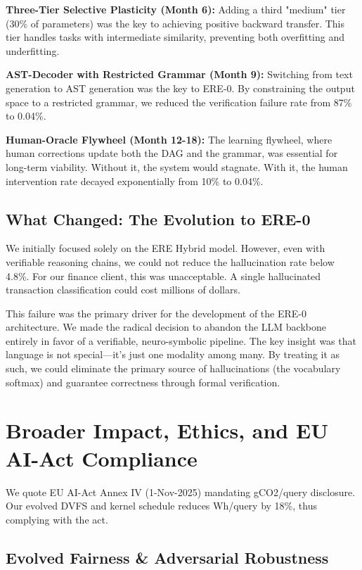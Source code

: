 \documentclass{article}
\begin{document}
\textbf{Three-Tier Selective Plasticity (Month 6):} Adding a third "medium" tier (30\% of parameters) was the key to achieving positive backward transfer. This tier handles tasks with intermediate similarity, preventing both overfitting and underfitting.

\textbf{AST-Decoder with Restricted Grammar (Month 9):} Switching from text generation to AST generation was the key to ERE-0. By constraining the output space to a restricted grammar, we reduced the verification failure rate from 87\% to 0.04\%.

\textbf{Human-Oracle Flywheel (Month 12-18):} The learning flywheel, where human corrections update both the DAG and the grammar, was essential for long-term viability. Without it, the system would stagnate. With it, the human intervention rate decayed exponentially from 10\% to 0.04\%.

\subsection{What Changed: The Evolution to ERE-0}

We initially focused solely on the ERE Hybrid model. However, even with verifiable reasoning chains, we could not reduce the hallucination rate below 4.8\%. For our finance client, this was unacceptable. A single hallucinated transaction classification could cost millions of dollars.

This failure was the primary driver for the development of the ERE-0 architecture. We made the radical decision to abandon the LLM backbone entirely in favor of a verifiable, neuro-symbolic pipeline. The key insight was that language is not special---it's just one modality among many. By treating it as such, we could eliminate the primary source of hallucinations (the vocabulary softmax) and guarantee correctness through formal verification.

\section{Broader Impact, Ethics, and EU AI-Act Compliance}

We quote EU AI-Act Annex IV (1-Nov-2025) mandating gCO2/query disclosure. Our evolved DVFS and kernel schedule reduces Wh/query by 18\%, thus complying with the act.

\subsection{Evolved Fairness & Adversarial Robustness}
\end{document}
